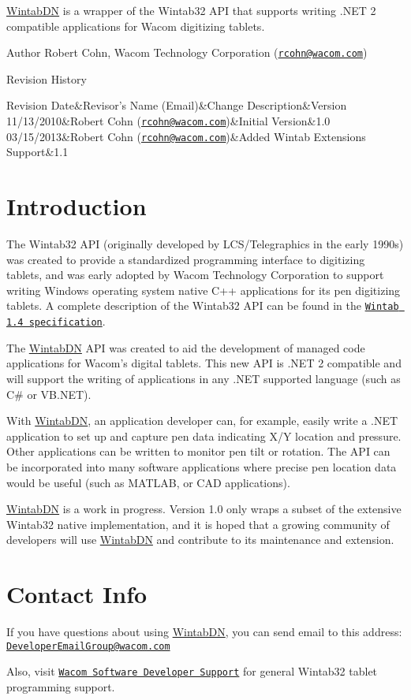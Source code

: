\hyperlink{namespace_wintab_d_n}{WintabDN} is a wrapper of the Wintab32 API that supports writing .NET 2 compatible applications for Wacom digitizing tablets. \begin{DoxyAuthor}{Author}
Robert Cohn, Wacom Technology Corporation (\href{mailto:rcohn@wacom.com}{\tt rcohn@wacom.com})
\end{DoxyAuthor}
\begin{DoxyParagraph}{Revision History}
\begin{TabularC}{4}
\hline
Revision Date&Revisor's Name (Email)&Change Description&Version  \\
11/13/2010&Robert Cohn (\href{mailto:rcohn@wacom.com}{\tt rcohn@wacom.com})&Initial Version&1.0  \\
03/15/2013&Robert Cohn (\href{mailto:rcohn@wacom.com}{\tt rcohn@wacom.com})&Added Wintab Extensions Support&1.1  \\
\end{TabularC}

\end{DoxyParagraph}
\hypertarget{index_intro_sec}{}\section{Introduction}\label{index_intro_sec}
The Wintab32 API (originally developed by LCS/Telegraphics in the early 1990s) was created to provide a standardized programming interface to digitizing tablets, and was early adopted by Wacom Technology Corporation to support writing Windows operating system native C++ applications for its pen digitizing tablets. A complete description of the Wintab32 API can be found in the \href{Wintab_v140.htm}{\tt Wintab 1.4 specification}.

The \hyperlink{namespace_wintab_d_n}{WintabDN} API was created to aid the development of managed code applications for Wacom's digital tablets. This new API is .NET 2 compatible and will support the writing of applications in any .NET supported language (such as C\# or VB.NET).

With \hyperlink{namespace_wintab_d_n}{WintabDN}, an application developer can, for example, easily write a .NET application to set up and capture pen data indicating X/Y location and pressure. Other applications can be written to monitor pen tilt or rotation. The API can be incorporated into many software applications where precise pen location data would be useful (such as MATLAB, or CAD applications).

\hyperlink{namespace_wintab_d_n}{WintabDN} is a work in progress. Version 1.0 only wraps a subset of the extensive Wintab32 native implementation, and it is hoped that a growing community of developers will use \hyperlink{namespace_wintab_d_n}{WintabDN} and contribute to its maintenance and extension.\hypertarget{index_contact_sec}{}\section{Contact Info}\label{index_contact_sec}
If you have questions about using \hyperlink{namespace_wintab_d_n}{WintabDN}, you can send email to this address: \href{mailto:DeveloperEmailGroup@wacom.com}{\tt DeveloperEmailGroup@wacom.com}

Also, visit \href{http://wacomeng.com/windows/index.html}{\tt Wacom Software Developer Support} for general Wintab32 tablet programming support. 